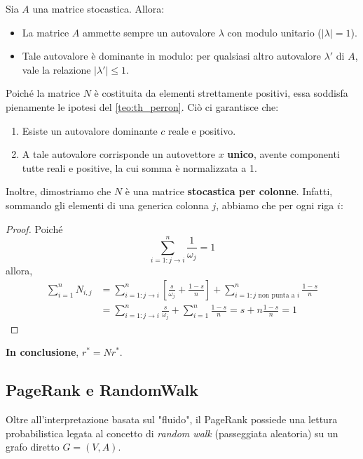 \begin{teorema}
Sia $A$ una matrice stocastica. Allora:

\begin{itemize}
    \item La matrice $A$ ammette sempre un autovalore $\lambda$ con modulo unitario ($|\lambda|=1$).
    \item Tale autovalore è dominante in modulo: per qualsiasi altro autovalore $\lambda'$ di $A$, vale la relazione $|\lambda'| \le 1$.
\end{itemize}
\end{teorema}

Poiché la matrice $N$ è costituita da elementi strettamente positivi, essa soddisfa pienamente le ipotesi del \autoref{teo:th_perron}.
Ciò ci garantisce che:
\begin{enumerate}
    \item Esiste un autovalore dominante $c$ reale e positivo.
    \item A tale autovalore corrisponde un autovettore $x$ \textbf{unico}, avente componenti tutte reali e positive, la cui somma è normalizzata a 1.
\end{enumerate}

Inoltre, dimostriamo che $N$ è una matrice \textbf{stocastica per colonne}. Infatti, sommando gli elementi di una generica colonna $j$, abbiamo che per ogni riga $i$:

\begin{proof}
    Poiché
    \[
        \sum_{i=1: j \to i}^{n} \frac{1}{\omega_j} = 1
    \]
    allora,
    \begin{align*}
        \sum_{i=1}^{n} N_{i,j} 
        &= \sum_{i=1: j \to i}^{n} \left[ \frac{s}{\omega_j} + \frac{1 - s}{n} \right] + \sum_{i=1: j \text{ non punta a } i}^{n} \frac{1-s}{n}\\
        &= \sum_{i=1: j \to i}^{n} \frac{s}{\omega_j} + \sum_{i=1}^{n} \frac{1-s}{n} = s + n \frac{1-s}{n} = 1
    \end{align*}
\end{proof}

\textbf{In conclusione}, $r^* = N r^*$.

\subsection{PageRank e RandomWalk}

Oltre all'interpretazione basata sul "fluido", il PageRank possiede una lettura probabilistica legata al concetto di \textit{random walk} (passeggiata aleatoria) su un grafo diretto $G = (V, A)$.

